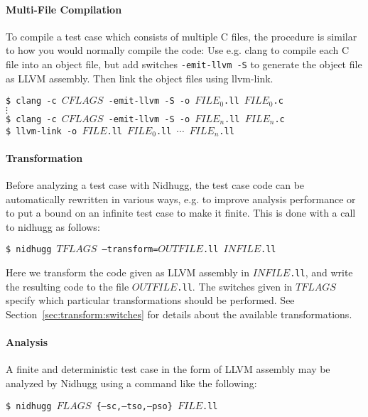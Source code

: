 \documentclass[a4paper]{article}
\begin{document}
\paragraph{Multi-File Compilation}
%
To compile a test case which consists of multiple C files, the
procedure is similar to how you would normally compile the code: Use
e.g. \textsf{clang} to compile each C file into an object file, but
add switches \texttt{-emit-llvm -S} to generate the object file as
LLVM assembly. Then link the object files using \textsf{llvm-link}.

\vspace{5pt}
\noindent
\texttt{\$ clang -c $CFLAGS$ -emit-llvm -S -o $FILE_0$.ll $FILE_0$.c}\\
$\vdots$\\
\texttt{\$ clang -c $CFLAGS$ -emit-llvm -S -o $FILE_n$.ll $FILE_n$.c}\\
\texttt{\$ llvm-link -o $FILE$.ll $FILE_0$.ll $\cdots$ $FILE_n$.ll}

\paragraph{Transformation}
%
Before analyzing a test case with Nidhugg, the test case code can be
automatically rewritten in various ways, e.g. to improve analysis
performance or to put a bound on an infinite test case to make it
finite. This is done with a call to \textsf{nidhugg} as follows:

\vspace{5pt}
\noindent
\texttt{\$ nidhugg $TFLAGS$ --transform=$OUTFILE$.ll $INFILE$.ll}

\vspace{5pt}\noindent
%
Here we transform the code given as LLVM assembly in
\texttt{$INFILE$.ll}, and write the resulting code to the file
\texttt{$OUTFILE$.ll}. The switches given in $TFLAGS$ specify which
particular transformations should be performed. See
Section~\ref{sec:transform:switches} for details about the available
transformations.

\paragraph{Analysis}
%
A finite and deterministic test case in the form of LLVM assembly may
be analyzed by Nidhugg using a command like the following:

\vspace{5pt}
\noindent
\texttt{\$ nidhugg $FLAGS$ \{--sc,--tso,--pso\} $FILE$.ll}
\end{document}
